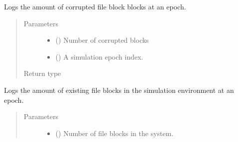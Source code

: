 \documentclass[letterpaper,10pt,english]{sphinxmanual}
\begin{document}
\begin{fulllineitems}
\begin{fulllineitems}
\label{\detokenize{app.domain.helpers:app.domain.helpers.smart_dataclasses.LoggingData.log_corrupted_file_blocks}}
Logs the amount of corrupted file block blocks at an epoch.
\begin{quote}\begin{description}
\item[{Parameters}] \leavevmode\begin{itemize}
\item {} 
 () \textendash{} Number of corrupted blocks

\item {} 
 () \textendash{} A simulation epoch index.

\end{itemize}

\item[{Return type}] \leavevmode
{}

\end{description}\end{quote}

\end{fulllineitems}


\begin{fulllineitems}
\label{\detokenize{app.domain.helpers:app.domain.helpers.smart_dataclasses.LoggingData.log_existing_file_blocks}}
Logs the amount of existing file blocks in the simulation environment at an epoch.
\begin{quote}\begin{description}
\item[{Parameters}] \leavevmode\begin{itemize}
\item {} 
 () \textendash{} Number of file blocks in the system.


\end{itemize}
\end{description}
\end{quote}
\end{fulllineitems}
\end{fulllineitems}
\end{document}
